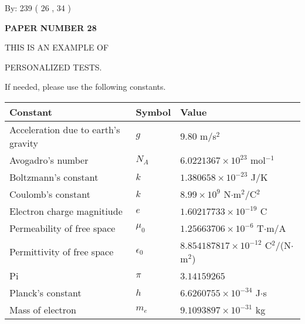 \documentclass[12pt]{article}
\begin{document}
   
\hspace{1.0in} By: 
         239 (          26 ,           34 )
   
   
   
   
\newpage 
\setcounter{page}{ 
    28001 } 
   
   
   
   
 {\textbf{ \Large{ PAPER NUMBER           28  }}}
   
   
\vspace{0.2in}
   
   
   
   
   
   
   
   
 \vspace{0.2in}
 
 
{\Huge  THIS IS AN EXAMPLE OF}
 
{\Huge  PERSONALIZED TESTS. }
 
If needed, please use the following constants.
 
 
 
\noindent\begin{tabular}{|l|l|l|}
\hline
Constant & Symbol & Value \\
\hline
Acceleration due to earth's gravity &
$g$ &
 $ 9.80 $
m/s$^2$ \\
\hline
Avogadro's number &
$N_A$ &
 $ 6.0221367 \times 10^{23} $
mol$^{-1}$ \\
\hline
Boltzmann's constant &
$k$ &
 $ 1.380658 \times 10^{-23} $
J/K \\
\hline
Coulomb's constant &
$k$ &
 $ 8.99 \times 10^{9} $
N$\cdot $m$^2$/C$^2$ \\
\hline
Electron charge magnitiude &
$e$ &
 $ 1.60217733 \times 10^{-19} $
C \\
\hline
Permeability of free space &
$\mu _0$ &
 $ 1.25663706 \times 10^{-6} $
T$\cdot $m/A \\
\hline
Permittivity of free space &
$\epsilon _0$ &
 $ 8.854187817 \times 10^{-12} $
C$^2$/(N$\cdot $m$^2$) \\
\hline
Pi &
$\pi$ &
 $ 3.14159265 $
$ $ \\
\hline
Planck's constant &
$h$ &
 $ 6.6260755 \times 10^{-34} $
J$\cdot $s \\
\hline
Mass of electron &
$m_e$ &
 $ 9.1093897 \times 10^{-31} $
kg \\
\hline
\end{tabular}
 
\end{document}
